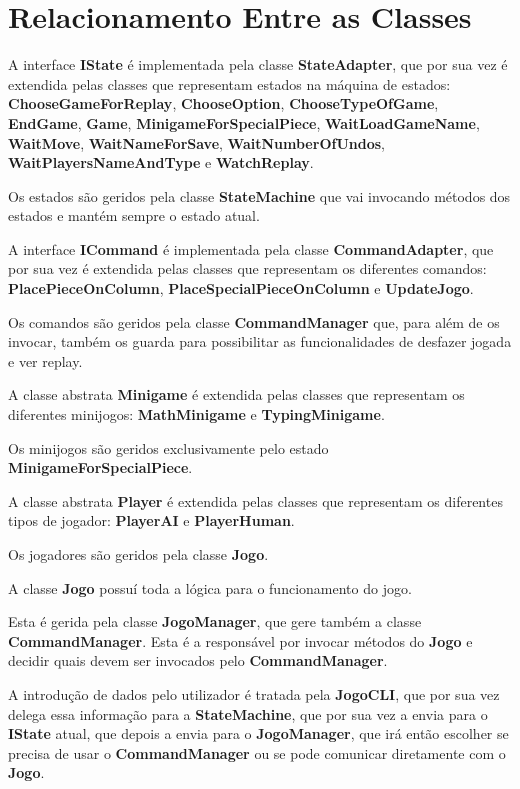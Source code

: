 \documentclass[11pt]{article}
\begin{document}
	\large
	\section{Relacionamento Entre as Classes}
	\normalsize
	
	A interface \textbf{IState} é implementada pela classe \textbf{StateAdapter}, que por sua vez é extendida pelas classes que representam estados na máquina de estados: \textbf{ChooseGameForReplay}, \textbf{ChooseOption}, \textbf{ChooseTypeOfGame}, \textbf{EndGame}, \textbf{Game}, \textbf{MinigameForSpecialPiece}, \textbf{WaitLoadGameName}, \textbf{WaitMove}, \textbf{WaitNameForSave}, \textbf{WaitNumberOfUndos}, \textbf{WaitPlayersNameAndType} e \textbf{WatchReplay}.
	
	Os estados são geridos pela classe \textbf{StateMachine} que vai invocando métodos dos estados e mantém sempre o estado atual.
	
	A interface \textbf{ICommand} é implementada pela classe \textbf{CommandAdapter}, que por sua vez é extendida pelas classes que representam os diferentes comandos: \textbf{PlacePieceOnColumn}, \textbf{PlaceSpecialPieceOnColumn} e \textbf{UpdateJogo}.
	
	Os comandos são geridos pela classe \textbf{CommandManager} que, para além de os invocar, também os guarda para possibilitar as funcionalidades de desfazer jogada e ver replay.
	
	A classe abstrata \textbf{Minigame} é extendida pelas classes que representam os diferentes minijogos: \textbf{MathMinigame} e \textbf{TypingMinigame}.
	
	Os minijogos são geridos exclusivamente pelo estado \textbf{MinigameForSpecialPiece}.
	
	A classe abstrata \textbf{Player} é extendida pelas classes que representam os diferentes tipos de jogador: \textbf{PlayerAI} e \textbf{PlayerHuman}.
	
	Os jogadores são geridos pela classe \textbf{Jogo}.
	
	A classe \textbf{Jogo} possuí toda a lógica para o funcionamento do jogo.
	
	Esta é gerida pela classe \textbf{JogoManager}, que gere também a classe \textbf{CommandManager}. Esta é a responsável por invocar métodos do \textbf{Jogo} e decidir quais devem ser invocados pelo \textbf{CommandManager}.
	
	A introdução de dados pelo utilizador é tratada pela \textbf{JogoCLI}, que por sua vez delega essa informação para a \textbf{StateMachine}, que por sua vez a envia para o \textbf{IState} atual, que depois a envia para o \textbf{JogoManager}, que irá então escolher se precisa de usar o \textbf{CommandManager} ou se pode comunicar diretamente com o \textbf{Jogo}.
	
\end{document}
